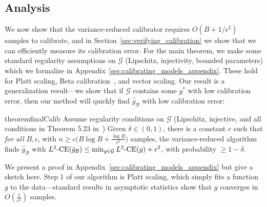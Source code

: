 

\subsection{Analysis}

We now show that the variance-reduced calibrator requires $O(B + 1/\epsilon^2)$ samples to calibrate, and in Section~\ref{sec:verifying_calibration} we show that we can efficiently measure its calibration error. For the main theorem, we make some standard regularity assumptions on $\mathcal{G}$ (Lipschitz, injectivity, bounded parameters) which we formalize in Appendix~\ref{sec:calibrating_models_appendix}. These hold for Platt scaling, Beta calibration~\cite{kull2017sigmoids}, and vector scaling. Our result is a generalization result---we show that if $\mathcal{G}$ contains some $g^*$ with low calibration error, then our method will quickly find $\hat{g}_{\mathcal{B}}$ with low calibration error:

\begin{restatable}{theorem}{finalCalib}
\label{thm:final-calib}
Assume regularity conditions on $\mathcal{G}$ (Lipschitz, injective, and all conditions in Theorem 5.23 in~\cite{vaart98asymptotic}) Given $\delta \in (0, 1)$, there is a constant $c$ such that \emph{for all} $B, \epsilon$, with $n \geq c \Big(B\log{B} + \frac{\log{B}}{\epsilon^2}\Big)$ samples, the variance-reduced algorithm finds $\hat{g}_{\mathcal{B}}$ with $L^2\mbox{-CE}(\hat{g}_{\mathcal{B}}) \leq \min_{g \in \mathcal{G}}L^2\mbox{-CE}(g) + \epsilon^2$, with probability $\geq 1 - \delta$.
\end{restatable}

We present a proof in Appendix~\ref{sec:calibrating_models_appendix} but give a sketch here. Step 1 of our algorithm is Platt scaling, which simply fits a function $g$ to the data---standard results in asymptotic statistics show that $g$ converges in $O(\frac{1}{\epsilon^2})$ samples.


